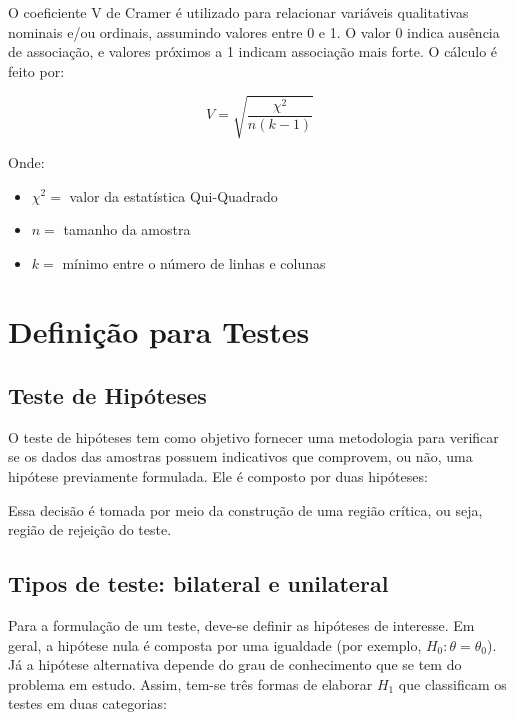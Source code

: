 \documentclass[
]{estat/estat}
\providecommand{\tightlist}{%
  \setlength{\itemsep}{0pt}\setlength{\parskip}{0pt}}\usepackage{longtable,booktabs,array}
\begin{document}
O coeficiente V de Cramer é utilizado para relacionar variáveis
qualitativas nominais e/ou ordinais, assumindo valores entre 0 e 1. O
valor 0 indica ausência de associação, e valores próximos a 1 indicam
associação mais forte. O cálculo é feito por:

\[
V = \sqrt{\frac{\chi^2}{n(k-1)}}
\]

Onde:

\begin{itemize}
\tightlist
\item
  \(\chi^2 =\) valor da estatística Qui-Quadrado
\item
  \(n =\) tamanho da amostra
\item
  \(k =\) mínimo entre o número de linhas e colunas
\end{itemize}

\section{Definição para Testes}\label{definiuxe7uxe3o-para-testes}

\subsection{Teste de Hipóteses}\label{teste-de-hipuxf3teses}

O teste de hipóteses tem como objetivo fornecer uma metodologia para
verificar se os dados das amostras possuem indicativos que comprovem, ou
não, uma hipótese previamente formulada. Ele é composto por duas
hipóteses:


Essa decisão é tomada por meio da construção de uma região crítica, ou
seja, região de rejeição do teste.

\subsection{Tipos de teste: bilateral e
unilateral}\label{tipos-de-teste-bilateral-e-unilateral}

Para a formulação de um teste, deve-se definir as hipóteses de
interesse. Em geral, a hipótese nula é composta por uma igualdade (por
exemplo, \(H_{0}: \theta = \theta_{0}\)). Já a hipótese alternativa
depende do grau de conhecimento que se tem do problema em estudo. Assim,
tem-se três formas de elaborar \(H_{1}\) que classificam os testes em
duas categorias:
\end{document}
